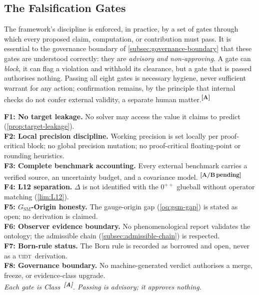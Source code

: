 \documentclass[12pt,a4paper,twoside]{article}
\theoremstyle{plain}
\theoremstyle{definition}
\theoremstyle{remark}
\newcommand{\UIDT}{\textsc{uidt}}
\newcommand{\catmark}[1]{\textsuperscript{\textsf{\textbf{[#1]}}}}
\begin{document}
\subsection{The Falsification Gates}
\label{subsec:falsification-gates}

The framework's discipline is enforced, in practice, by a set of gates through which every proposed claim, computation, or contribution must pass. It is essential to the governance boundary of \cref{subsec:governance-boundary} that these gates are understood correctly: they are \emph{advisory and non-approving}. A gate can \emph{block}, it can flag a violation and withhold its clearance, but a gate that is passed authorises nothing. Passing all eight gates is necessary hygiene, never sufficient warrant for any action; confirmation remains, by the principle that internal checks do not confer external validity, a separate human matter.\catmark{A}

\begin{governancebox}
\textbf{F1: No target leakage.} No solver may access the value it claims to
predict (\cref{prop:target-leakage}).\\[0.3em]
\textbf{F2: Local precision discipline.} Working precision is set locally per proof-critical block; no global precision mutation; no proof-critical
floating-point or rounding heuristics.\\[0.3em]
\textbf{F3: Complete benchmark accounting.} Every external benchmark carries a
verified source, an uncertainty budget, and a covariance model. \catmark{A/B\,pending}\\[0.3em]
\textbf{F4: L12 separation.} $\Delta$ is not identified with the $0^{++}$
glueball without operator matching (\cref{lim:L12}).\\[0.3em]
\textbf{F5: $G_{\mathrm{SM}}$-Origin honesty.} The gauge-origin gap
(\cref{oq:gsm-gap}) is stated as open; no derivation is claimed.\\[0.3em]
\textbf{F6: Observer evidence boundary.} No phenomenological report validates the ontology; the admissible chain (\cref{subsec:admissible-chain}) is
respected.\\[0.3em]
\textbf{F7: Born-rule status.} The Born rule is recorded as borrowed and
open, never as a \UIDT\ derivation.\\[0.3em]
\textbf{F8: Governance boundary.} No machine-generated verdict authorises a
merge, freeze, or evidence-class upgrade.\\[0.3em]
\emph{Each gate is Class~\catmark{A}. Passing is advisory; it approves nothing.}
\end{governancebox}
\end{document}
